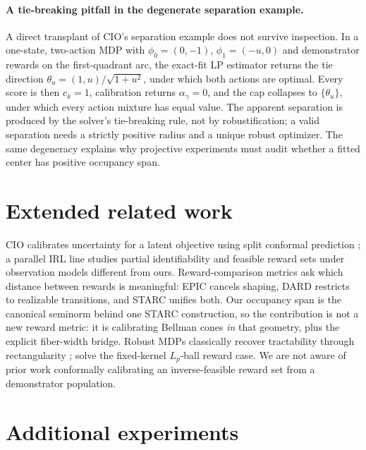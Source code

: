 \documentclass{article}
\begin{document}
\paragraph{A tie-breaking pitfall in the degenerate separation example.}
A direct transplant of CIO's separation example does not survive inspection. In
a one-state, two-action MDP with $\phi_0=(0,-1)$, $\phi_1=(-u,0)$ and
demonstrator rewards on the first-quadrant arc, the exact-fit LP estimator
returns the tie direction $\theta_u=(1,u)/\sqrt{1+u^2}$, under which both
actions are optimal. Every score is then $c_k=1$, calibration returns
$\alpha_\gamma=0$, and the cap collapses to $\{\theta_u\}$, under which every
action mixture has equal value. The apparent separation is produced by the
solver's tie-breaking rule, not by robustification; a valid separation needs a
strictly positive radius and a unique robust optimizer. The same degeneracy
explains why projective experiments must audit whether a fitted center has
positive occupancy span.

\section{Extended related work}
\label{app:related}

CIO calibrates uncertainty for a latent objective
\citep{lin2024conformal} using split conformal prediction
\citep{vovk2005algorithmic}; a parallel IRL line studies partial identifiability
and feasible reward sets \citep{skalse2023invariance,kim2024unified,
poiani2024suboptimal,lazzati2025robustness,kim2026feasible} under observation
models different from ours. Reward-comparison metrics ask which distance between
rewards is meaningful: EPIC \citep{gleave2021epic} cancels shaping, DARD
\citep{wulfe2022dard} restricts to realizable transitions, and STARC
\citep{skalse2024starc} unifies both. Our occupancy span is the canonical
seminorm behind one STARC construction, so the contribution is not a new reward
metric: it is calibrating Bellman cones \emph{in} that geometry, plus the
explicit fiber-width bridge. Robust MDPs classically recover tractability
through rectangularity \citep{iyengar2005robust,wiesemann2013robust};
\citet{gadot2024solving} solve the fixed-kernel $L_p$-ball reward case. We are
not aware of prior work conformally calibrating an inverse-feasible reward set
from a demonstrator population.

\section{Additional experiments}
\label{app:extra}
\end{document}
